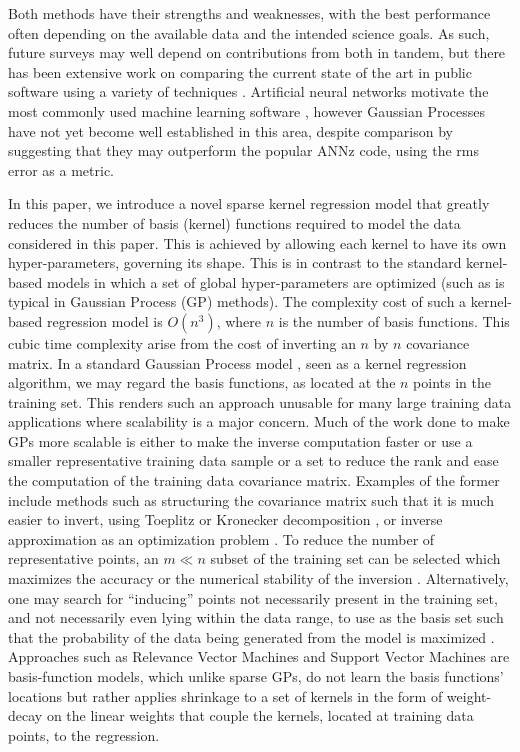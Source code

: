 \documentclass[useAMS,usenatbib,fleqn]{mn2e}
\begin{document}
Both methods have their strengths and weaknesses, with the best performance often depending on the available data and the intended science goals. As such, future surveys may well depend on contributions from both in tandem, but there has been extensive work on comparing the current state of the art in public software using a variety of techniques \citep{hildebrandt10,abdalla11,sanchez14}. Artificial neural networks motivate the most commonly used machine learning software \citep{Firth2003,vanzella2004photometric,brescia2014catalogue}, however Gaussian Processes \citep[e.g.][]{Way2009} have not yet become well established in this area, despite comparison by \citet{bonfield10} suggesting that they may outperform the popular {\sc ANNz} code, using the rms error as a metric. 


In this paper, we introduce a novel sparse kernel regression model that greatly reduces the number of basis (kernel) functions required to model the data considered in this paper. This is achieved by allowing each kernel to have its own hyper-parameters, governing its shape. This is in contrast to the standard kernel-based models in which a set of global hyper-parameters are optimized (such as is typical in Gaussian Process (GP) methods). The complexity cost of such a kernel-based regression model is $O\left(n^{3}\right)$, where $n$ is the number of basis functions. This cubic time complexity arise from the cost of inverting an $n$ by $n$ covariance matrix. In a standard Gaussian Process model \citep{rasmussen2006gaussian}, seen as a kernel regression algorithm, we may regard the basis functions, as located at the $n$ points in the training set. This renders such an approach unusable for many large training data applications where scalability is a major concern. Much of the work done to make GPs more scalable is either to make the inverse computation faster or use a smaller representative training data sample or a set to reduce the rank and ease the computation of the training data covariance matrix. Examples of the former include methods such as structuring the covariance matrix such that it is much easier to invert, using Toeplitz  \citep{zhang2005time} or Kronecker decomposition \citep{tsiligkaridis2013}, or inverse approximation as an optimization problem \citep{gibbs97}. To reduce the number of representative points, an $m \ll n$ subset of the training set can be selected which maximizes the accuracy or the numerical stability of the inversion \citep{foster2009}. Alternatively, one may search for ``inducing'' points not necessarily present in the training set, and not necessarily even lying within the data range, to use as the basis set such that the probability of the data being generated from the model is maximized \citep{snelson2005}. Approaches such as Relevance Vector Machines \citep[RVM;][]{tipping2001} and Support Vector Machines \citep[SVM;][]{smola1997} are basis-function models, which unlike sparse GPs, do not learn the basis functions' locations but rather applies shrinkage to a set of kernels in the form of weight-decay on the linear weights that couple the kernels, located at training data points, to the regression. 
\end{document}
